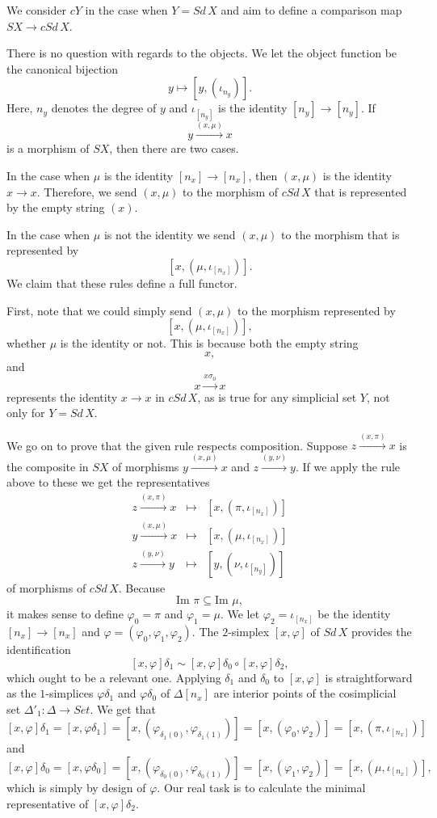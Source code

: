We consider $cY$ in the case when $Y=Sd\, X$ and aim to define a comparison map $SX\to cSd\, X$.

There is no question with regards to the objects. We let the object function be the canonical
bijection
\[y\mapsto [y,(\iota _{n_y})].\]
Here, $n_y$ denotes the degree of $y$ and $\iota _{[n_y]}$ is the identity $[n_y]\to [n_y]$. If
\[y\xrightarrow{(x,\mu )} x\]
is a morphism of $SX$, then there are two cases.

In the case when $\mu$ is the identity $[n_x]\to [n_x]$, then
$(x,\mu )$ is the
identity $x\to x$. Therefore, we send $(x,\mu )$ to the morphism of $cSd\, X$ that is represented by the empty string $(x)$.

In the case when $\mu$ is not the identity we send $(x,\mu )$ to the morphism that is represented by
\[[x,(\mu ,\iota _{[n_x]})].\]
We claim that these rules define a full functor.

First, note that we could simply send $(x,\mu )$ to the morphism represented by
\[[x,(\mu ,\iota _{[n_x]})],\]
whether $\mu$ is the identity or not. This is because both the empty string
\[x,\]
and
\[x\xrightarrow{x\sigma _0} x\]
represents the identity $x\to x$ in $cSd\, X$, as is true for any simplicial set $Y$, not only for $Y=Sd\, X$.

We go on to prove that the given rule respects composition. Suppose $z\xrightarrow{(x,\pi )} x$ is the composite in $SX$ of morphisms $y\xrightarrow{(x,\mu )} x$ and $z\xrightarrow{(y,\nu )} y$. If we apply the rule above to these we get the representatives
\begin{displaymath}
 \begin{array}{rcl}
  z\xrightarrow{(x,\pi )} x & \mapsto & [x,(\pi ,\iota _{[n_x]})] \\
  y\xrightarrow{(x,\mu )} x & \mapsto & [x,(\mu ,\iota _{[n_x]})] \\
  z\xrightarrow{(y,\nu )} y & \mapsto & [y,(\nu ,\iota _{[n_y]})]
 \end{array}
\end{displaymath}
of morphisms of $cSd\, X$. Because
\[\textrm{Im } \pi \subseteq \textrm{Im } \mu ,\]
it makes sense to define $\varphi _0=\pi$ and $\varphi _1=\mu$. We let $\varphi _2=\iota _{[n_x]}$ be the identity $[n_x]\to [n_x]$ and $\varphi =(\varphi _0,\varphi _1,\varphi _2)$. The $2$-simplex $[x,\varphi ]$ of $Sd\, X$ provides
the identification
\[[x,\varphi ]\delta _1\sim [x,\varphi ]\delta _0\circ [x,\varphi ]\delta _2,\]
which ought to be a relevant one. Applying $\delta _1$ and $\delta _0$ to $[x,\varphi ]$ is straightforward
as the $1$-simplices $\varphi \delta _1$ and $\varphi \delta _0$ of $\Delta [n_x]$ are interior points of the cosimplicial
set $\Delta '_1:\Delta \to Set$. We get that
\[[x,\varphi ]\delta _1=[x,\varphi \delta _1]=[x,(\varphi _{\delta _1(0)},\varphi _{\delta _1(1)})]=[x,(\varphi _0,\varphi _2)]=[x,(\pi,\iota _{[n_x]})]\]
and
\[[x,\varphi ]\delta _0=[x,\varphi \delta _0]=[x,(\varphi _{\delta _0(0)},\varphi _{\delta _0(1)})]=[x,(\varphi _1,\varphi _2)]=[x,(\mu,\iota _{[n_x]})],\]
which is simply by design of $\varphi$. Our real task is to calculate the minimal representative of $[x,\varphi ]\delta _2$.

